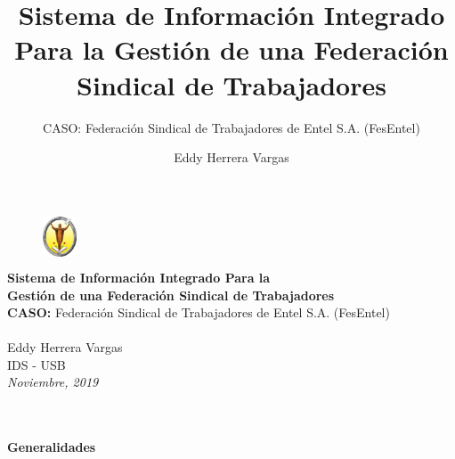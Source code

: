 \documentclass[xcolor=dvipsnames, xcolor=table]{beamer}
\title{Sistema de Información Integrado Para la Gestión de una Federación Sindical de Trabajadores}
\subtitle{CASO: Federación Sindical de Trabajadores de Entel S.A. (FesEntel)}
\author{Eddy Herrera Vargas}
\institute{IDS - USB}
\begin{document}
\begin{frame}

    \begin{figure}
      \begin{columns}
        \column{\dimexpr\linewidth-35mm-5mm}
        \column{3mm}
        \includegraphics[width=10mm]{usb.pdf}
      \end{columns}
    \end{figure}

  \vspace{-3mm}
  \Large\textbf{\textcolor{color1}{Sistema de Información Integrado Para la\\ Gestión de una Federación Sindical de Trabajadores}}\\
  \vspace{3mm}
  \small{\textcolor{color2}{\textbf{CASO:} Federación Sindical de Trabajadores de Entel S.A. (FesEntel)}}\\
  \vspace{2mm}
  \color{color3}{\rule{10.5cm}{0.6pt}}\\
  \vspace{8mm}
  \textcolor{color1}{\small{Eddy Herrera Vargas}\\
  \vspace{2mm}
  \scriptsize{IDS - USB }\\
  \vspace{2mm}
  \textit{\scriptsize{Noviembre, 2019}}}

\end{frame}

\begin{frame}
    \centering\color{color3}{\rule{7cm}{5pt}}\\
    \vspace{-3mm}
    \centering\color{color3}{\rule{7cm}{1.5pt}}\\
    \vspace{2mm}
    \centering\textbf{\huge{\textcolor{color1}{Generalidades}}}\\
    \centering\color{color3}{\rule{7cm}{1.5pt}}\\
\end{frame}
\end{document}
